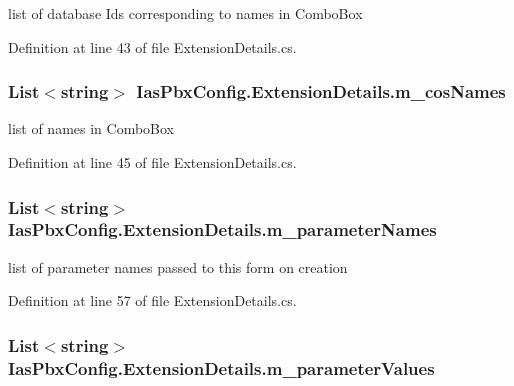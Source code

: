 list of database Ids corresponding to names in ComboBox 

Definition at line 43 of file ExtensionDetails.cs.\hypertarget{class_ias_pbx_config_1_1_extension_details_ab5b6312c7e2360dc541b257899c9f155}{
\subsubsection[{m\_\-cosNames}]{\setlength{\rightskip}{0pt plus 5cm}List$<$string$>$ {\bf IasPbxConfig.ExtensionDetails.m\_\-cosNames}}}
\label{class_ias_pbx_config_1_1_extension_details_ab5b6312c7e2360dc541b257899c9f155}


list of names in ComboBox 

Definition at line 45 of file ExtensionDetails.cs.\hypertarget{class_ias_pbx_config_1_1_extension_details_a0a375b1d694804212890f8b6fb739b21}{
\subsubsection[{m\_\-parameterNames}]{\setlength{\rightskip}{0pt plus 5cm}List$<$string$>$ {\bf IasPbxConfig.ExtensionDetails.m\_\-parameterNames}}}
\label{class_ias_pbx_config_1_1_extension_details_a0a375b1d694804212890f8b6fb739b21}


list of parameter names passed to this form on creation 

Definition at line 57 of file ExtensionDetails.cs.\hypertarget{class_ias_pbx_config_1_1_extension_details_af61633a6131c4dfa44232218ab2026c8}{
\subsubsection[{m\_\-parameterValues}]{\setlength{\rightskip}{0pt plus 5cm}List$<$string$>$ {\bf IasPbxConfig.ExtensionDetails.m\_\-parameterValues}}}
\label{class_ias_pbx_config_1_1_extension_details_af61633a6131c4dfa44232218ab2026c8}


